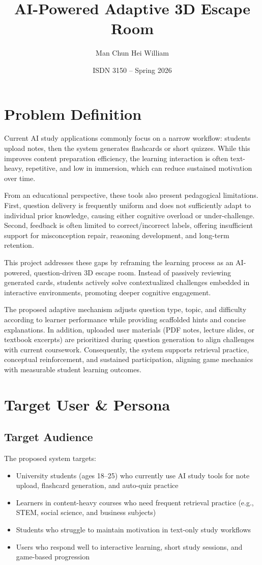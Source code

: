 \documentclass[12pt]{article}
\title{AI-Powered Adaptive 3D Escape Room}
\author{Man Chun Hei William}
\date{ISDN 3150 -- Spring 2026}
\begin{document}
\maketitle

\section{Problem Definition}

Current AI study applications commonly focus on a narrow workflow: students upload notes, then the system generates flashcards or short quizzes. While this improves content preparation efficiency, the learning interaction is often text-heavy, repetitive, and low in immersion, which can reduce sustained motivation over time.

From an educational perspective, these tools also present pedagogical limitations. First, question delivery is frequently uniform and does not sufficiently adapt to individual prior knowledge, causing either cognitive overload or under-challenge. Second, feedback is often limited to correct/incorrect labels, offering insufficient support for misconception repair, reasoning development, and long-term retention.

This project addresses these gaps by reframing the learning process as an AI-powered, question-driven 3D escape room. Instead of passively reviewing generated cards, students actively solve contextualized challenges embedded in interactive environments, promoting deeper cognitive engagement.

The proposed adaptive mechanism adjusts question type, topic, and difficulty according to learner performance while providing scaffolded hints and concise explanations. In addition, uploaded user materials (PDF notes, lecture slides, or textbook excerpts) are prioritized during question generation to align challenges with current coursework. Consequently, the system supports retrieval practice, conceptual reinforcement, and sustained participation, aligning game mechanics with measurable student learning outcomes.

\section{Target User \& Persona}

\subsection{Target Audience}
The proposed system targets:
\begin{itemize}
    \item University students (ages 18--25) who currently use AI study tools for note upload, flashcard generation, and auto-quiz practice
    \item Learners in content-heavy courses who need frequent retrieval practice (e.g., STEM, social science, and business subjects)
    \item Students who struggle to maintain motivation in text-only study workflows
    \item Users who respond well to interactive learning, short study sessions, and game-based progression
\end{itemize}
\end{document}
